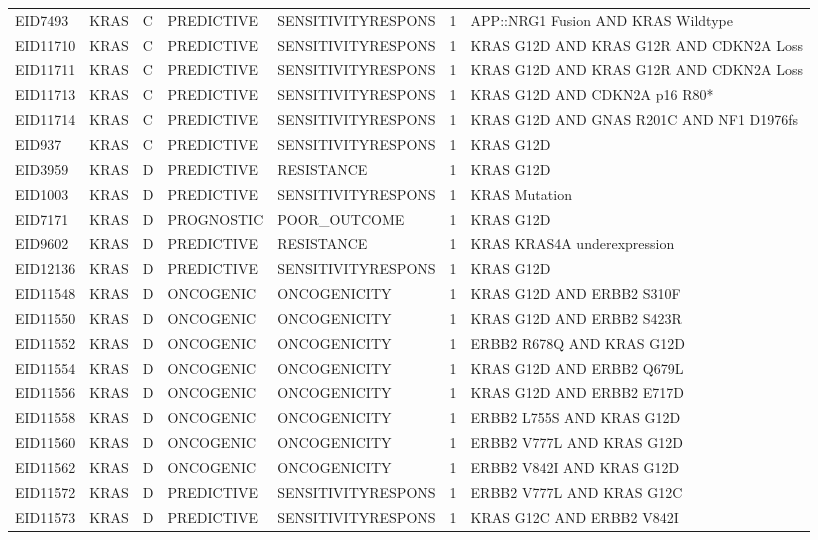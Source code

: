 \begin{footnotesize}
\begin{longtable}{llllllp{4.2cm}}
EID7493 & KRAS & C & PREDICTIVE & SENSITIVITYRESPONS & 1 & APP::NRG1 Fusion AND KRAS Wildtype \\
EID11710 & KRAS & C & PREDICTIVE & SENSITIVITYRESPONS & 1 & KRAS G12D AND KRAS G12R AND CDKN2A Loss  \\
EID11711 & KRAS & C & PREDICTIVE & SENSITIVITYRESPONS & 1 & KRAS G12D AND KRAS G12R AND CDKN2A Loss  \\
EID11713 & KRAS & C & PREDICTIVE & SENSITIVITYRESPONS & 1 & KRAS G12D AND CDKN2A p16 R80* \\
EID11714 & KRAS & C & PREDICTIVE & SENSITIVITYRESPONS & 1 & KRAS G12D AND GNAS R201C AND NF1 D1976fs \\
EID937 & KRAS & C & PREDICTIVE & SENSITIVITYRESPONS & 1 & KRAS G12D \\
EID3959 & KRAS & D & PREDICTIVE & RESISTANCE & 1 & KRAS G12D \\
EID1003 & KRAS & D & PREDICTIVE & SENSITIVITYRESPONS & 1 & KRAS Mutation \\
EID7171 & KRAS & D & PROGNOSTIC & POOR\_OUTCOME & 1 & KRAS G12D \\
EID9602 & KRAS & D & PREDICTIVE & RESISTANCE & 1 & KRAS KRAS4A underexpression \\
EID12136 & KRAS & D & PREDICTIVE & SENSITIVITYRESPONS & 1 & KRAS G12D \\
EID11548 & KRAS & D & ONCOGENIC & ONCOGENICITY & 1 & KRAS G12D AND ERBB2 S310F \\
EID11550 & KRAS & D & ONCOGENIC & ONCOGENICITY & 1 & KRAS G12D AND ERBB2 S423R \\
EID11552 & KRAS & D & ONCOGENIC & ONCOGENICITY & 1 & ERBB2 R678Q AND KRAS G12D \\
EID11554 & KRAS & D & ONCOGENIC & ONCOGENICITY & 1 & KRAS G12D AND ERBB2 Q679L \\
EID11556 & KRAS & D & ONCOGENIC & ONCOGENICITY & 1 & KRAS G12D AND ERBB2 E717D \\
EID11558 & KRAS & D & ONCOGENIC & ONCOGENICITY & 1 & ERBB2 L755S AND KRAS G12D \\
EID11560 & KRAS & D & ONCOGENIC & ONCOGENICITY & 1 & ERBB2 V777L AND KRAS G12D \\
EID11562 & KRAS & D & ONCOGENIC & ONCOGENICITY & 1 & ERBB2 V842I AND KRAS G12D \\
EID11572 & KRAS & D & PREDICTIVE & SENSITIVITYRESPONS & 1 & ERBB2 V777L AND KRAS G12C \\
EID11573 & KRAS & D & PREDICTIVE & SENSITIVITYRESPONS & 1 & KRAS G12C AND ERBB2 V842I  \\

\end{longtable}
\end{footnotesize}
